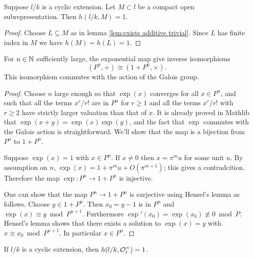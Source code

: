 \begin{lemma} \label{lem:herbrand compact open additive}
	Suppose $l/k$ is a cyclic extension.
	Let $M \subset l$ be a compact open subrepresentation.
	Then $h(l/k,M)=1$.
\end{lemma}

\begin{proof}
	Choose $L \subseteq M$ as in lemma \ref{lem:exists additive trivial}.
	Since $L$ has finite index in $M$ we have $h(M) = h(L) = 1$.
\end{proof}


\begin{lemma}\label{lem:local isomorphism}
	For $n \in {\mathbb N}$ sufficiently large, the
	exponential map give inverse isomorphisms
	\[
		(P^n,+) \cong (1 + P^n, \times).
	\]
	This isomorphism commutes with the action of the Galois group.
\end{lemma}

\begin{proof}
	Choose $n$ large enough so that $\exp(x)$ converges for all $x \in P^n$,
	and such that all the terms $x^r/r!$ are in $P^n$ for $r \ge 1$
	and all the terms $x^r / r!$ with $r \ge 2$ have strictly larger valuation than that of $x$.
	It is already proved in Mathlib that $\exp(x+y)=\exp(x)\exp(y)$, and the fact that $\exp$ commutes
	with the Galois action is straightforward.
	We'll show that the map is a bijection from $P^n$ to $1+P^n$.

	Suppose $\exp(x)=1$ with $x \in P^n$.
	If $x \ne 0$ then $x = \pi^mu$ for some unit $u$.
	By assumption on $n$, $\exp(x) = 1 + \pi^m u + O(\pi^{m+1})$; this gives a contradcition.
	Therefore the map $\exp : P^n \to 1+P^n$ is injective.

	One can show that the map $P^n \to 1+P^n$ is surjective using Hensel's lemma as follows.
	Choose $y \in 1+P^n$. Then $x_0 = y-1$ is in $P^n$ and $\exp(x) \equiv y \bmod P^{n+1}$.
	Furthermore $\exp'(x_0) = \exp(x_0) \not\equiv 0 \bmod P$. Hensel's lemma shows that there exists
	a solution to $\exp(x)=y$ with $x \equiv x_0 \bmod P^{n+1}$.
	In particular $x \in P^n$.
\end{proof}


\begin{lemma}\label{lem:herbrand local units}
	If $l/k$ is a cyclic extension, then $h(l/k, {\mathcal O}_l^\times) = 1$.
\end{lemma}

